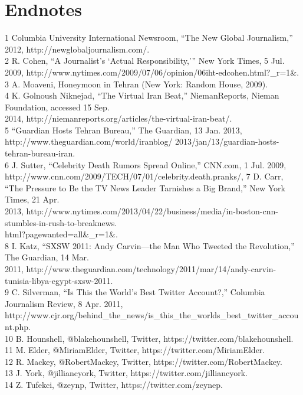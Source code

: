 \chapter{Endnotes}

1 Columbia University International Newsroom, ``The New Global Journalism,'' 2012,
http://newglobaljournalism.com/.\\
2 R. Cohen, ``A Journalist’s ‘Actual Responsibility,’'' New York Times, 5 Jul. 2009,
http://www.nytimes.com/2009/07/06/opinion/06iht-edcohen.html?_r=1&.\\
3 A. Moaveni, Honeymoon in Tehran (New York: Random House, 2009).\\
4 K. Golnoush Niknejad, ``The Virtual Iran Beat,'' NiemanReports, Nieman Foundation, accessed 15 Sep.\\
2014, http://niemanreports.org/articles/the-virtual-iran-beat/.\\
5 ``Guardian Hosts Tehran Bureau,'' The Guardian, 13 Jan. 2013, http://www.theguardian.com/world/iranblog/
2013/jan/13/guardian-hosts-tehran-bureau-iran.\\
6 J. Sutter, ``Celebrity Death Rumors Spread Online,'' CNN.com, 1 Jul. 2009,
http://www.cnn.com/2009/TECH/07/01/celebrity.death.pranks/,
7 D. Carr, ``The Pressure to Be the TV News Leader Tarnishes a Big Brand,'' New York Times, 21 Apr.\\
2013, http://www.nytimes.com/2013/04/22/business/media/in-boston-cnn-stumbles-in-rush-to-breaknews.\\
html?pagewanted=all&_r=1&.\\
8 I. Katz, ``SXSW 2011: Andy Carvin—the Man Who Tweeted the Revolution,'' The Guardian, 14 Mar.\\
2011, http://www.theguardian.com/technology/2011/mar/14/andy-carvin-tunisia-libya-egypt-sxsw-2011.\\
9 C. Silverman, ``Is This the World’s Best Twitter Account?,'' Columbia Journalism Review, 8 Apr. 2011,
http://www.cjr.org/behind_the_news/is_this_the_worlds_best_twitter_account.php.\\
10 B. Hounshell, @blakehounshell, Twitter, https://twitter.com/blakehounshell.\\
11 M. Elder, @MiriamElder, Twitter, https://twitter.com/MiriamElder.\\
12 R. Mackey, @RobertMackey, Twitter, https://twitter.com/RobertMackey.\\
13 J. York, @jilliancyork, Twitter, https://twitter.com/jilliancyork.\\
14 Z. Tufekci, @zeynp, Twitter, https://twitter.com/zeynep.\\

